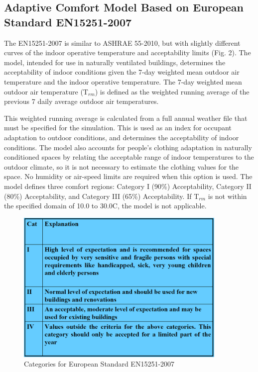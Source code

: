 \subsection{Adaptive Comfort Model Based on European Standard EN15251-2007}\label{adaptive-comfort-model-based-on-european-standard-en15251-2007}

The EN15251-2007 is similar to ASHRAE 55-2010, but with slightly different curves of the indoor operative temperature and acceptability limits (Fig. 2). The model, intended for use in naturally ventilated buildings, determines the acceptability of indoor conditions given the 7-day weighted mean outdoor air temperature and the indoor operative temperature. The 7-day weighted mean outdoor air temperature (T\(_{rm}\)) is defined as the weighted running average of the previous 7 daily average outdoor air temperatures.

This weighted running average is calculated from a full annual weather file that must be specified for the simulation. This is used as an index for occupant adaptation to outdoor conditions, and determines the acceptability of indoor conditions. The model also accounts for people's clothing adaptation in naturally conditioned spaces by relating the acceptable range of indoor temperatures to the outdoor climate, so it is not necessary to estimate the clothing values for the space. No humidity or air-speed limits are required when this option is used. The model defines three comfort regions: Category I (90\%) Acceptability, Category II (80\%) Acceptability, and Category III (65\%) Acceptability. If T\(_{rm}\) is not within the specified domain of 10.0 to 30.0C, the model is not applicable.

\begin{figure}[hbtp] %
\centering
\includegraphics[width=0.9\textwidth, height=0.9\textheight, keepaspectratio=true]{media/image6819.png}
\caption{Categories for European Standard EN15251-2007 \protect \label{fig:categories-for-european-standard-en15251-2007}}
\end{figure}


